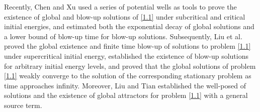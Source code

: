 \documentclass[11pt,a4paper]{article}
\numberwithin{equation}{section}
\numberwithin{remark}{section}
\begin{document}
Recently, Chen and Xu \cite{MR3961341} used a series of potential wells as tools to prove the existence of global and blow-up solutions of \eqref{1.1} under subcritical and critical initial energies, and estimated both the exponential decay of global solutions and a lower bound of blow-up time for blow-up solutions. Subsequently, Liu et al. \cite{MR4854159} proved the global existence and finite time blow-up of solutions to problem \eqref{1.1} under supercritical initial energy, established the existence of blow-up solutions for arbitrary initial energy levels, and proved that the global solutions of problem \eqref{1.1} weakly converge to the solution of the corresponding stationary problem as time approaches infinity. Moreover, Liu and Tian \cite{MR4709392} established the well-posed of solutions and the existence of global attractors for problem \eqref{1.1} with a general source term.
\end{document}
